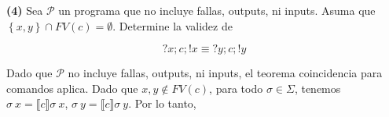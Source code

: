 \documentclass[a4paper, 12pt]{article}
\begin{document}
\pagebreak 

\begin{myframe}
  \textbf{(4)} Sea $\mathcal{P}$ un programa que no incluye fallas, outputs, ni
  inputs. Asuma que $\left\{ x, y \right\} \cap FV(c) = \emptyset$. Determine la
  validez de 

  \begin{equation*}
    ?x; c; !x \equiv ?y ; c; !y
  \end{equation*}
\end{myframe}

Dado que $\mathcal{P}$ no incluye fallas, outputs, ni inputs, el teorema
coincidencia para comandos aplica. Dado que $x, y \not\in FV(c)$, para todo
$\sigma \in \Sigma$, tenemos $\sigma ~ x = \llbracket c \rrbracket \sigma ~ x$,
$\sigma ~ y = \llbracket c \rrbracket \sigma ~ y$. Por lo tanto, 
\end{document}
